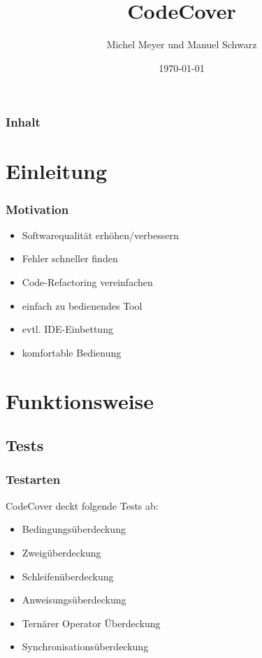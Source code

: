 \documentclass{beamer}
\begin{document}
  \title[CodeCover\hspace{105mm}\insertframenumber/\inserttotalframenumber]{CodeCover}
  \author{Michel Meyer und Manuel Schwarz}
  \date{\today}

  \begin{frame}
    \titlepage
  \end{frame}

  \begin{frame}
    \frametitle{Inhalt}
    \tableofcontents
  \end{frame}


  \section{Einleitung}
  \begin{frame}
    \frametitle{Motivation}
    \begin{itemize}[<+->]
      \item Softwarequalität erhöhen/verbessern
      \item Fehler schneller finden
      \item Code-Refactoring vereinfachen
      \item einfach zu bedienendes Tool
      \item evtl. IDE-Einbettung
      \item komfortable Bedienung
    \end{itemize}
  \end{frame}

  \section{Funktionsweise}
  \subsection{Tests}
  \begin{frame}\frametitle{Testarten}
  CodeCover deckt folgende Tests ab:
    \begin{itemize}[<+->]
      \item Bedingungsüberdeckung
      \item Zweigüberdeckung
      \item Schleifenüberdeckung
      \item Anweisungsüberdeckung
      \item Ternärer Operator Überdeckung
      \item Synchronisationsüberdeckung
    \end{itemize}
  \end{frame}
\end{document}
